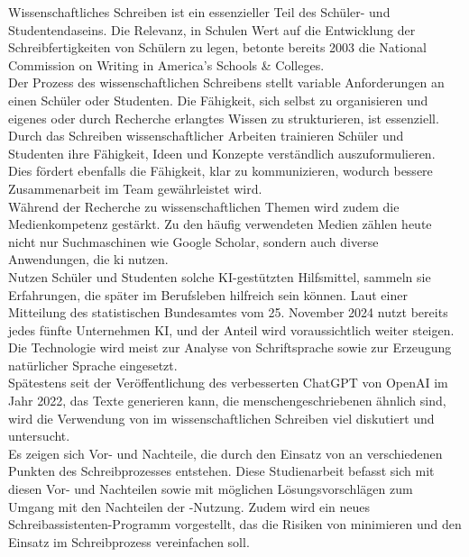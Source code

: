 \documentclass[../main.tex]{subfiles}
\begin{document}
Wissenschaftliches Schreiben ist ein essenzieller Teil des Schüler- und Studentendaseins. Die Relevanz, in Schulen Wert auf die Entwicklung der Schreibfertigkeiten von Schülern zu legen, 
betonte bereits 2003 die National Commission on Writing in America’s Schools \& Colleges\cite{nationalcommissionwriting}. \\ Der Prozess des wissenschaftlichen Schreibens stellt variable 
Anforderungen an einen Schüler oder Studenten. Die Fähigkeit, sich selbst zu organisieren und eigenes oder durch Recherche erlangtes Wissen zu strukturieren, ist essenziell. Durch das 
Schreiben wissenschaftlicher Arbeiten trainieren Schüler und Studenten ihre Fähigkeit, Ideen und Konzepte verständlich auszuformulieren. Dies fördert ebenfalls die Fähigkeit, klar zu 
kommunizieren, wodurch bessere Zusammenarbeit im Team gewährleistet wird.\cite{nationalcommissionwriting,teachers,humanWritingToAi} \\ 
Während der Recherche zu wissenschaftlichen Themen wird zudem die Medienkompetenz gestärkt. Zu den häufig verwendeten Medien zählen heute nicht nur Suchmaschinen wie Google Scholar, sondern 
auch diverse Anwendungen, die \gls{ki} nutzen.\\ Nutzen Schüler und Studenten solche KI-gestützten Hilfsmittel, sammeln sie Erfahrungen, die später im Berufsleben hilfreich sein können. Laut 
einer Mitteilung des statistischen Bundesamtes vom 25. November 2024 nutzt bereits jedes fünfte Unternehmen KI, und der Anteil wird voraussichtlich weiter steigen\cite{statistischesBundesamt}. 
Die Technologie wird meist zur Analyse von Schriftsprache sowie zur Erzeugung natürlicher Sprache eingesetzt\cite{statistischesBundesamt}.\\ 
Spätestens seit der Veröffentlichung des verbesserten ChatGPT von OpenAI im Jahr 2022, das Texte generieren kann, die menschengeschriebenen ähnlich sind, wird die Verwendung von 
 im wissenschaftlichen Schreiben viel diskutiert und untersucht.\cite{humanWritingToAi,ZukunftWissenschaftlichesPublizieren}\\
Es zeigen sich Vor- und Nachteile, die durch den Einsatz von  an verschiedenen Punkten des Schreibprozesses entstehen. Diese Studienarbeit befasst sich mit diesen 
Vor- und Nachteilen sowie mit möglichen Lösungsvorschlägen zum Umgang mit den Nachteilen der -Nutzung. Zudem wird ein neues Schreibassistenten-Programm vorgestellt, das 
die Risiken von  minimieren und den Einsatz im Schreibprozess vereinfachen soll.
\end{document}
